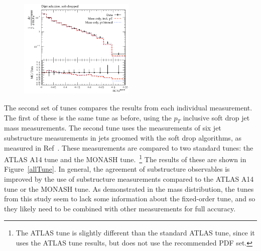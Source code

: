 \begin{figure}
\begin{center}
\includegraphics[width=0.49\textwidth]{figs/RivetPlotsMassOnly/ATLAS_2019_I1724098/d27-x01-y01.pdf} \hfill
\end{center}
\label{massOnlyTune}
\end{figure}


The second set of tunes compares the results from each individual measurement. The first of these is the same tune as before, using the $p_T$ inclusive soft drop jet mass measurements.
The second tune uses the measurements of six jet substructure measurements in jets groomed with the soft drop algorithms, as measured in Ref~\cite{Aaboud:2019aii}.
These measurements are compared to two standard tunes: the ATLAS A14 tune and the MONASH tune.~\footnote{The ATLAS tune is slightly different than the standard ATLAS tune, since it uses the ATLAS tune results, but does not use the recommended PDF set.}
The results of these are shown in Figure~\ref{allTune}. 
In general, the agreement of substructure observables is improved by the use of substructure measurements compared to the ATLAS A14 tune or the MONASH tune.
As demonstrated in the mass distribution, the tunes from this study seem to lack some information about the fixed-order tune, 
and so they likely need to be combined with other measurements for full accuracy. 


